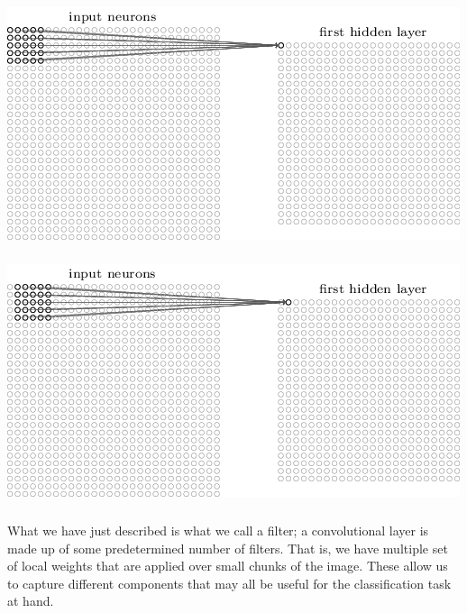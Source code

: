 \documentclass[xetex,mathserif,serif,aspectratio=169]{beamer}
\begin{document}
\begin{frame}[fragile] \frametitle{} \oldB \small

\begin{center}
\includegraphics[height=0.7\textheight]{img/tikz44.png}
\end{center}

\end{frame}

\begin{frame}[fragile] \frametitle{} \oldB \small

\begin{center}
\includegraphics[height=0.7\textheight]{img/tikz45.png}
\end{center}

\end{frame}

\begin{frame}[fragile] \frametitle{} \oldB \small

\textbf{}

What we have just described is what we call a filter; a
convolutional layer is made up of some predetermined
number of filters. That is, we have multiple set of local
weights that are applied over small chunks of the image.
These allow us to capture different components that may
all be useful for the classification task at hand.

\end{frame}
\end{document}
